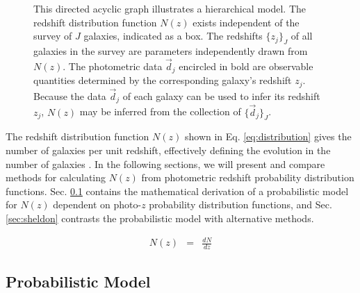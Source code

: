 \documentclass[preprint]{aastex}
\begin{document}
\begin{figure}
\vspace{0.5cm}
\begin{center}
\caption{This directed acyclic graph illustrates a hierarchical model.  The 
redshift distribution function $N(z)$ exists independent of the survey of $J$ 
galaxies, indicated as a box.  The redshifts $\{z_{j}\}_{J}$ of all galaxies in 
the survey are parameters independently drawn from $N(z)$.  The photometric 
data $\vec{d}_{j}$ encircled in bold are observable quantities determined by 
the corresponding galaxy's redshift $z_{j}$.  Because the data $\vec{d}_{j}$ of 
each galaxy can be used to infer its redshift $z_{j}$, $N(z)$ may be inferred 
from the collection of $\{\vec{d}_{j}\}_{J}$.}
\label{fig:flow}
\end{center}
\end{figure}

The redshift distribution function $N(z)$ shown in Eq. \ref{eq:distribution} 
gives the number of galaxies per unit redshift, effectively defining the 
evolution in the number of galaxies \citep{Menard2013}.  In the following 
sections, we will present and compare methods for calculating $N(z)$ from 
photometric redshift probability distribution functions.  Sec. \ref{sec:prob} 
contains the mathematical derivation of a probabilistic model for $N(z)$ 
dependent on photo-$z$ probability distribution functions, and Sec. 
\ref{sec:sheldon} contrasts the probabilistic model with alternative methods.

\begin{eqnarray}
\label{eq:distribution}
N(z) &=& \frac{dN}{dz}
\end{eqnarray}

\clearpage
\subsection{Probabilistic Model}
\label{sec:prob}
\end{document}
